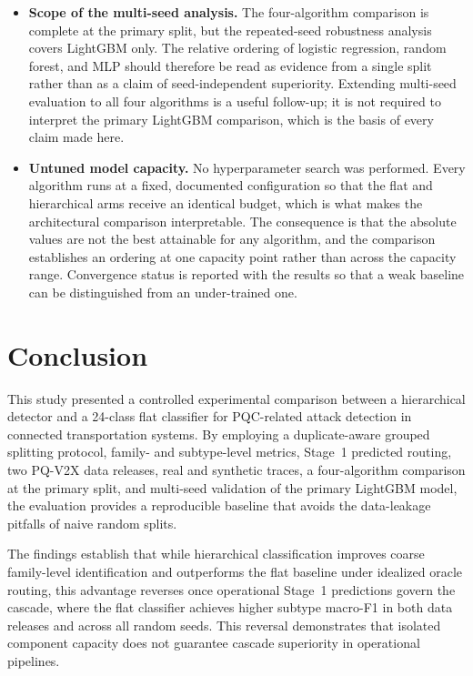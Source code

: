 \documentclass{IEEEoj}
\begin{document}
\begin{itemize}
    \item \textbf{Scope of the multi-seed analysis.} The four-algorithm comparison is complete at the primary split, but the repeated-seed robustness analysis covers LightGBM only. The relative ordering of logistic regression, random forest, and MLP should therefore be read as evidence from a single split rather than as a claim of seed-independent superiority. Extending multi-seed evaluation to all four algorithms is a useful follow-up; it is not required to interpret the primary LightGBM comparison, which is the basis of every claim made here.
    \item \textbf{Untuned model capacity.} No hyperparameter search was performed. Every algorithm runs at a fixed, documented configuration so that the flat and hierarchical arms receive an identical budget, which is what makes the architectural comparison interpretable. The consequence is that the absolute values are not the best attainable for any algorithm, and the comparison establishes an ordering at one capacity point rather than across the capacity range. Convergence status is reported with the results so that a weak baseline can be distinguished from an under-trained one.
\end{itemize}

\section{Conclusion}

This study presented a controlled experimental comparison between a hierarchical detector and a 24-class flat classifier for PQC-related attack detection in connected transportation systems. By employing a duplicate-aware grouped splitting protocol, family- and subtype-level metrics, Stage~1 predicted routing, two PQ-V2X data releases, real and synthetic traces, a four-algorithm comparison at the primary split, and multi-seed validation of the primary LightGBM model, the evaluation provides a reproducible baseline that avoids the data-leakage pitfalls of naive random splits.

The findings establish that while hierarchical classification improves coarse family-level identification and outperforms the flat baseline under idealized oracle routing, this advantage reverses once operational Stage~1 predictions govern the cascade, where the flat classifier achieves higher subtype macro-F1 in both data releases and across all random seeds. This reversal demonstrates that isolated component capacity does not guarantee cascade superiority in operational pipelines.
\end{document}
